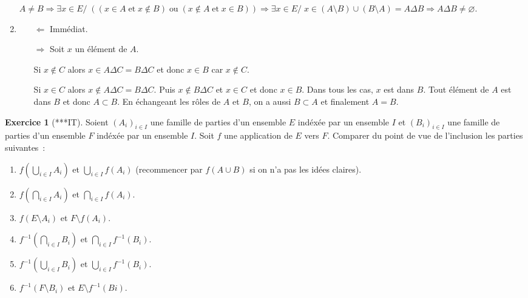 \documentclass[11pt,a4paper]{article}
\theoremstyle{definition}
\newtheorem{exo}{Exercice}
\newcommand{\exercice}[1]{} \newcommand{\finexercice}{}
\newcommand{\enonce}{\begin{exo}} \newcommand{\finenonce}{\end{exo}}
\newcommand{\noindication}{\stepcounter{ind}}
\begin{document}
\begin{enumerate}
$A\neq B\Rightarrow\exists x\in E/\;((x\in A\;\mbox{et}\;x\notin B)\;\mbox{ou}\;(x\notin A\;\mbox{et}\;
x\in B))\Rightarrow\exists x\in E/\;x\in(A\setminus B)\cup(B\setminus A)=A\Delta B\Rightarrow A\Delta B\neq\varnothing$.

 \item 
\begin{itemize}
\item[$\Leftarrow$] Immédiat.
\item[$\Rightarrow$] Soit $x$ un élément de $A$.

Si $x\notin C$ alors $x\in A\Delta C=B\Delta C$ et donc $x\in B$ car $x\notin C$.

Si $x\in C$ alors $x\notin A\Delta C=B\Delta C$. Puis $x\notin B\Delta C$ et $x\in C$ et donc $x\in B$. Dans tous les
cas, $x$ est dans $B$. Tout élément de $A$ est dans $B$ et donc $A\subset B$.
En échangeant les rôles de $A$ et $B$, on a aussi $B\subset A$ et finalement $A=B$.
\end{itemize}
\end{enumerate}
\fincorrection
\finexercice
\exercice{5113, rouget, 2010/06/30}
\enonce[***IT]
Soient $(A_i)_{i\in I}$ une famille de parties d'un ensemble $E$ indéxée par un ensemble $I$ et $(B_i)_{i\in I}$ une
famille de parties d'un ensemble $F$ indéxée par un ensemble $I$. Soit $f$ une
application de $E$ vers $F$. Comparer du point de vue de l'inclusion les parties suivantes~:

\begin{enumerate}
\item  $f(\bigcup_{i\in I}A_i)$ et $\bigcup_{i\in I}f(A_i)$ (recommencer par $f(A\cup B)$ si on n'a pas les 
idées claires).
\item  $f(\bigcap_{i\in I}A_i)$ et $\bigcap_{i\in I}f(A_i)$.
\item  $f(E\setminus A_i)$ et $F\setminus f(A_i)$.
\item  $f^{-1}(\bigcap_{i\in I}B_i)$ et $\bigcap_{i\in I}f^{-1}(B_i)$.
\item  $f^{-1}(\bigcup_{i\in I}B_i)$ et $\bigcup_{i\in I}f^{-1}(B_i)$.
\item  $f^{-1}(F\setminus B_i)$ et $E\setminus f^{-1}(Bi)$.
\end{enumerate}
\finenonce

\noindication
\end{document}
